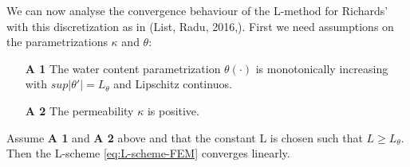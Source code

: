 \documentclass[../Main/main.tex]{subfiles}
\begin{document}
	We can now analyse the convergence behaviour of the L-method for Richards' with this discretization as in (List, Radu, 2016,\cite{list2016study}).
	First we need assumptions on the parametrizations $\kappa $ and $\theta$:
	\begin{itemize}
		\item[\textbf{A 1}] The water content parametrization $\theta(\cdot)$ is monotonically increasing with $sup|\theta'| = L_{\theta}$ and Lipschitz continuos.
		\item[\textbf{A 2}] The permeability $\kappa$ is positive. 
	\end{itemize}
	\begin{theorem}
		Assume \textbf{A 1} and \textbf{A 2} above and that the constant L is chosen such that $L \geq L_{\theta}$. Then the L-scheme \eqref{eq:L-scheme-FEM} converges linearly. 
	\end{theorem}
\end{document}
